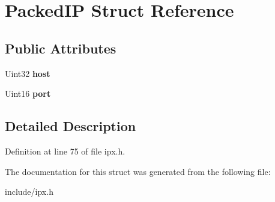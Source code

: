 \hypertarget{structPackedIP}{\section{Packed\-I\-P Struct Reference}
\label{structPackedIP}
}
\subsection*{Public Attributes}
\begin{DoxyCompactItemize}
\item 
\hypertarget{structPackedIP_a9138788c30e9f64d99b4d48fc00a0825}{Uint32 {\bfseries host}}\label{structPackedIP_a9138788c30e9f64d99b4d48fc00a0825}

\item 
\hypertarget{structPackedIP_a316bdab1b9b65998a6750814029f5e0e}{Uint16 {\bfseries port}}\label{structPackedIP_a316bdab1b9b65998a6750814029f5e0e}

\end{DoxyCompactItemize}


\subsection{Detailed Description}


Definition at line 75 of file ipx.\-h.



The documentation for this struct was generated from the following file\-:\begin{DoxyCompactItemize}
\item 
include/ipx.\-h\end{DoxyCompactItemize}
